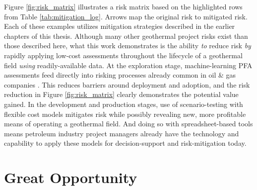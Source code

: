 Figure \ref{fig:risk_matrix} illustrates a risk matrix based on the highlighted rows from Table \ref{tab:mitigation_log}. Arrows map the original risk to mitigated risk. Each of these examples utilizes mitigation strategies described in the earlier chapters of this thesis. Although many other geothermal project risks exist than those described here, what this work demonstrates is the ability \textit{to} reduce risk \textit{by} rapidly applying low-cost assessments throughout the lifecycle of a geothermal field \textit{using} readily-available data. At the exploration stage, machine-learning PFA assessments feed directly into risking processes already common in oil \& gas companies \citep{nash_adaptation_2015}. This reduces barriers around deployment and adoption, and the risk reduction in Figure \ref{fig:risk_matrix} clearly demonstrates the potential value gained. In the development and production stages, use of scenario-testing with flexible cost models mitigates risk while possibly revealing new, more profitable means of operating a geothermal field. And doing so with spreadsheet-based tools means petroleum industry project managers already have the technology and capability to apply these models for decision-support and risk-mitigation today. 

\section{Great Opportunity}

